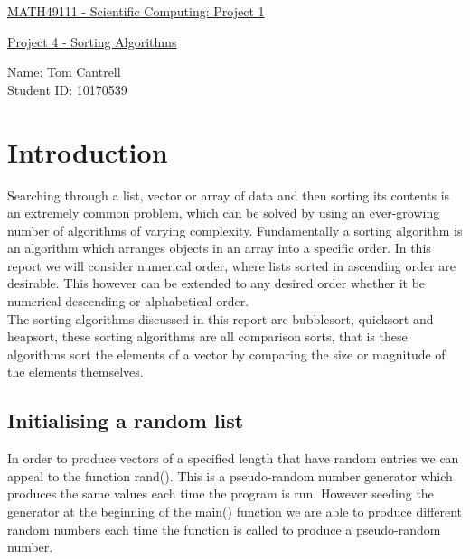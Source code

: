 \documentclass[a4paper, 12pt]{article}
\begin{document}
\begin{titlepage}
\begin{center}
\Large\underline{MATH49111 - Scientific Computing:   Project 1}\\
\end{center}
\begin{center}
\large\underline{Project 4 - Sorting Algorithms}
\end{center}
Name: Tom Cantrell\\
Student ID: 10170539\\
\end{titlepage}

\tableofcontents
\newpage
\section{Introduction}
Searching through a list, vector or array of data and then sorting its contents is an extremely common problem, which can be solved by using an ever-growing number of algorithms of varying complexity. Fundamentally a sorting algorithm is an algorithm which arranges objects in an array into a specific order. In this report we will consider numerical order, where lists sorted in ascending order are desirable. This however can be extended to any desired order whether it be numerical descending or alphabetical order. \\

The sorting algorithms discussed in this report are bubblesort, quicksort and heapsort, these sorting algorithms are all comparison sorts, that is these algorithms sort the elements of a vector by comparing the size or magnitude of the elements themselves. 

\subsection{Initialising a random list}
In order to produce vectors of a specified length that have random entries we can appeal to the function rand(). This is a pseudo-random number generator which produces the same values each time the program is run. However seeding the generator at the beginning of the main() function we are able to produce different random numbers each time the function is called to produce a pseudo-random number. \\
\end{document}
